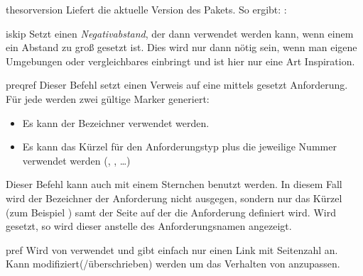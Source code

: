 \documentclass{sopra-base}
\begin{document}
\begin{command}{thesorversion}{}
    Liefert die aktuelle Version des Pakets. So ergibt: : \thesorversion\\
\end{command}

\begin{command}{iskip}{}
    Setzt einen \emph{Negativabstand}, der dann verwendet werden kann, wenn einem ein Abstand zu groß gesetzt ist. Dies wird nur dann nötig sein, wenn man eigene Umgebungen oder vergleichbares einbringt und ist hier nur eine Art Inspiration.
\end{command}

\begin{command}{preqref}{}
    Dieser Befehl setzt einen Verweis auf eine mittels  gesetzt Anforderung. Für jede werden zwei gültige Marker generiert: \begin{itemize}\setlength{\itemsep}{0pt}
        \item Es kann der Bezeichner verwendet werden.
        \item Es kann das Kürzel für den Anforderungstyp plus die jeweilige Nummer verwendet werden (, , \ldots)
    \end{itemize}
    Dieser Befehl kann auch mit einem Sternchen benutzt werden. In diesem Fall wird der
    Bezeichner der Anforderung nicht ausgegen, sondern nur das Kürzel (zum Beispiel ) samt der Seite auf der die Anforderung definiert wird. Wird  gesetzt, so wird
    dieser anstelle des Anforderungsnamen angezeigt.
\end{command}

\begin{command}{pref}{}
    Wird von  verwendet und gibt einfach nur einen Link mit Seitenzahl an.
    Kann modifiziert(/überschrieben) werden um das Verhalten von  anzupassen.
\end{command}
\end{document}
